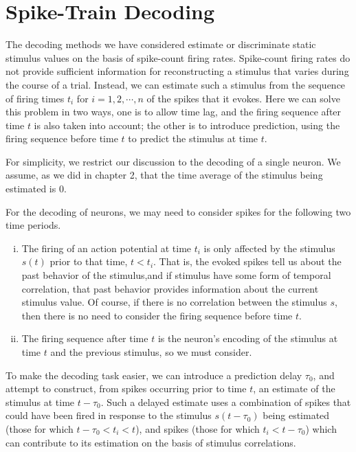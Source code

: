 \section{Spike-Train Decoding}
\label{sec:Spike-Train Decoding}

\begin{rem}
The decoding methods we have considered estimate or discriminate static
stimulus values on the basis of spike-count firing rates. Spike-count firing
rates do not provide sufficient information for reconstructing a stimulus
that varies during the course of a trial. Instead, we can estimate such a
stimulus from the sequence of firing times $t_{i}$ for $i=1,2,\cdots,n$ of the spikes
that it evokes. Here we can solve this problem in two ways, one is to allow time lag, and the firing sequence after time $t$ is also taken into account; the other is to introduce prediction, using the firing sequence before time $t$ to predict the stimulus at time $t$.
\end{rem}

\begin{asm}
  For simplicity, we restrict our discussion to the decoding of a single
neuron. We assume, as we did in chapter 2, that the time average of the
stimulus being estimated is $0$.
\end{asm}


\begin{prop}
  For the decoding of neurons, we may need to consider spikes for the
  following two time periods.
  \begin{enumerate}[(i)]
  \item   The firing of an action potential at time $t_{i}$ is only affected by
  the stimulus $s(t)$ prior to that time, $t<t_{i}$. That is, the
  evoked spikes tell us about the past behavior of the stimulus,and if stimulus have some
form of temporal correlation, that past behavior provides information
about the current stimulus value. Of course, if there is no correlation
between the stimulus $s$, then there is no need to consider the firing
sequence before time $t$.
\item The firing sequence after time $t$ is the neuron's encoding of the stimulus at time $t$ and the previous stimulus, so we must consider.
  \end{enumerate}

\end{prop}

\begin{prop}
  To make the decoding task easier, we
can introduce a prediction delay $\tau_{0}$, and attempt to construct, from spikes
occurring prior to time $t$, an estimate of the stimulus at time $t-\tau_{0}$. Such a delayed estimate uses a combination of spikes that
could have been fired in response to the stimulus $s(t-\tau_{0})$ being estimated
(those for which $t-\tau_{0}<t_i<t$), and spikes
(those for which $t_i<t-\tau_{0}$) which can contribute to its estimation on the basis
of stimulus correlations.

\end{prop}

